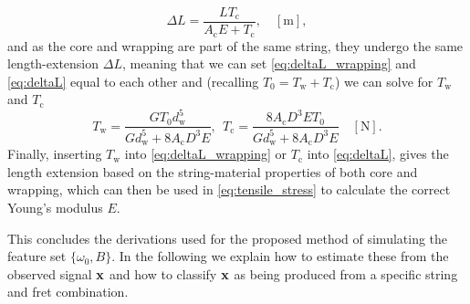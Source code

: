 \documentclass{article}
\begin{document}
\begin{sloppy}
%
\begin{equation}\label{eq:deltaL}
    \Delta L= \frac{LT_\text{c}}{A_\text{c}E + T_\text{c}}, \quad  [\text{m}], 
\end{equation}
%
and as the core and wrapping are part of the same string, they undergo the same length-extension $\Delta L$, meaning that we can set \eqref{eq:deltaL_wrapping} and \eqref{eq:deltaL} equal to each other and (recalling $T_0=T_\text{w}+T_\text{c}$) we can solve for $T_\text{w}$ and $T_\text{c}$
%
%
\begin{equation}
    T_\text{w} = \frac{GT_0d_\text{w}^5}{Gd_\text{w}^5 + 8A_\text{c}D^3E}, \ \ T_\text{c} = \frac{8A_\text{c}D^3ET_0}{Gd_\text{w}^5+8A_\text{c}D^3E}\quad [\text{N}].
\end{equation}
%
%
Finally, inserting $T_\text{w}$ into \eqref{eq:deltaL_wrapping} or $T_\text{c}$ into \eqref{eq:deltaL}, gives the length extension based on the string-material properties of both core and wrapping, which can then be used in \eqref{eq:tensile_stress} to calculate the correct Young's modulus $E$.

This concludes the derivations used for the proposed method of simulating the feature set $\{\omega_0, B\}$. In the following we explain how to estimate these from the observed signal $\mathbf x$ and how to classify $\mathbf x$ as being produced from a specific string and fret combination.
%

\end{sloppy}
\end{document}

